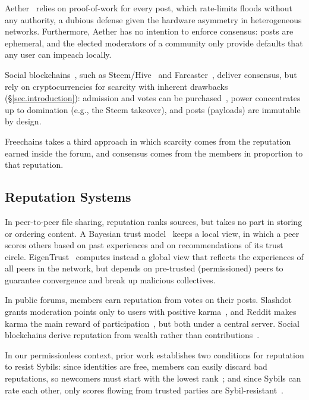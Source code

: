 \documentclass[10pt,twocolumn]{article}
\newcommand{\FC}       {Freechains\xspace}
\begin{document}
Aether~\cite{p2p.ecosystem} relies on proof-of-work for every post, which
rate-limits floods without any authority, a dubious defense given the hardware
asymmetry in heterogeneous networks.
%
Furthermore, Aether has no intention to enforce consensus: posts are ephemeral,
and the elected moderators of a community only provide defaults that any user
can impeach locally.

Social blockchains~\cite{dosn.navigating,blockchain.osn}, such as
Steem/Hive~\cite{p2p.steem} and Farcaster~\cite{p2p.farcaster.imc}, deliver
consensus, but rely on cryptocurrencies for scarcity with inherent drawbacks
(\S\ref{sec.introduction}):
    admission and votes can be purchased~\cite{p2p.steemit.bots},
    power concentrates up to domination (e.g., the Steem takeover), and
    posts (payloads) are immutable by design.

\FC takes a third approach in which scarcity comes from the reputation earned
inside the forum, and consensus comes from the members in proportion to that
reputation.

\subsection{Reputation Systems}
\label{sec.related.reps}

In peer-to-peer file sharing, reputation ranks sources, but takes no part
in storing or ordering content.
%
A Bayesian trust model~\cite{p2p.rep.wang} keeps a local view, in which a peer
scores others based on past experiences and on recommendations of its trust
circle.
%
EigenTrust~\cite{rep.eigentrust} computes instead a global view that reflects
the experiences of all peers in the network, but depends on pre-trusted
(permissioned) peers to guarantee convergence and break up malicious
collectives.

In public forums, members earn reputation from votes on their posts.
%
Slashdot grants moderation points only to users with positive
karma~\cite{forum.slashdot}, and Reddit makes karma the main reward of
participation~\cite{forum.reddit.karma}, but both under a central server.
%
Social blockchains derive reputation from wealth rather than
contributions~\cite{p2p.steem.wealth}.

In our permissionless context, prior work establishes two conditions for
reputation to resist Sybils:
%
since identities are free, members can easily discard bad reputations, so
newcomers must start with the lowest rank~\cite{rep.pseudonyms}; and
since Sybils can rate each other, only scores flowing from trusted
parties are Sybil-resistant~\cite{rep.sybilproof,sybil.guard,sybil.limit}.
\end{document}
